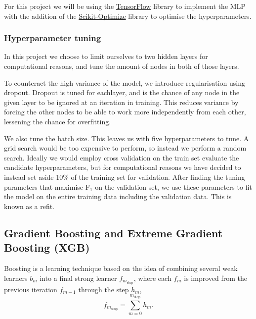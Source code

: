 \documentclass[a4paper, 11pt, twocolumn]{article}
\begin{document}
For this project we will be using the \href{https://www.tensorflow.org/}
{TensorFlow} library to implement the MLP with the addition of the
\href{https://scikit-optimize.github.io/}{Scikit-Optimize} library to optimise
the hyperparameters.

\subsubsection{Hyperparameter tuning}
In this project we choose to limit ourselves to two hidden layers for 
computational reasons, and tune the amount of nodes in both of those layers.

To counteract the high variance of the model, we introduce regularisation using 
dropout. Dropout is tuned for eachlayer, and is the chance of any node in the 
given layer to be ignored at an iteration in training. This reduces variance by 
forcing the other nodes to be able to work more independently from each other, 
lessening the chance for overfitting.

We also tune the batch size. This leaves us with five hyperparameters to tune. A 
grid search would be too expensive to perform, so instead we perform a random
search. Ideally we would employ cross validation on the train set evaluate the 
candidate hyperparameters, but for computational reasons we have decided to 
instead set aside 10\% of the training set for validation. After finding the 
tuning parameters that maximise F$_1$ on the validation set, we use these 
parameters to fit the model on the entire training data including the validation 
data. This is known as a refit. 


\subsection{Gradient Boosting and Extreme Gradient Boosting (XGB)}
Boosting is a learning technique based on the idea of combining several weak
learners $b_m$ into a final strong learner $f_{m_\text{stop}}$, where each
$f_m$ is improved from the previous iteration $f_{m-1}$ through the step $h_m$,
\begin{equation}
      f_{m_\text{stop}} = \sum_{m=0}^{m_\text{stop}} h_m.
\end{equation}
\end{document}
